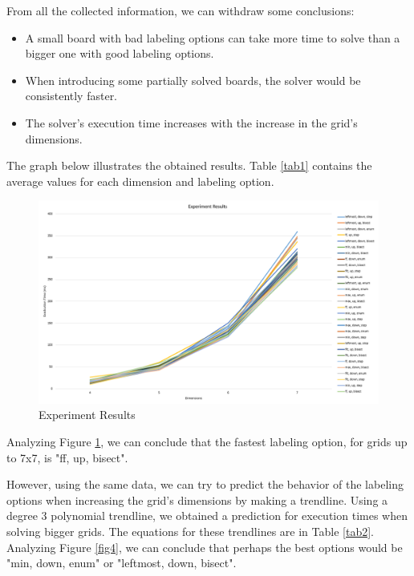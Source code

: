 \documentclass[runningheads]{llncs}
\begin{document}
From all the collected information, we can withdraw some conclusions:
\begin{itemize}
    \item A small board with bad labeling options can take more time to solve
            than a bigger one with good labeling options.
    \item When introducing some partially solved boards, the solver would be consistently faster.
    \item The solver's execution time increases with the increase in the grid's dimensions.
\end{itemize}

The graph below illustrates the obtained results.
Table \ref{tab1} contains the average values for each dimension and labeling option.

\begin{figure}
    \centering
    \includegraphics[width=\textwidth]{img/execution_times.png}
    \caption{Experiment Results} \label{fig3}
\end{figure}
Analyzing Figure \ref{fig3}, we can conclude that the fastest labeling option,
    for grids up to 7x7, is "ff, up, bisect".

However, using the same data, we can try to predict the behavior of the labeling options
    when increasing the grid's dimensions by making a trendline.
Using a degree 3 polynomial trendline, we obtained a prediction for execution times when solving bigger grids.
The equations for these trendlines are in Table \ref{tab2}.
Analyzing Figure \ref{fig4}, we can conclude that perhaps the best options would be
    "min, down, enum" or "leftmost, down, bisect".
\end{document}
